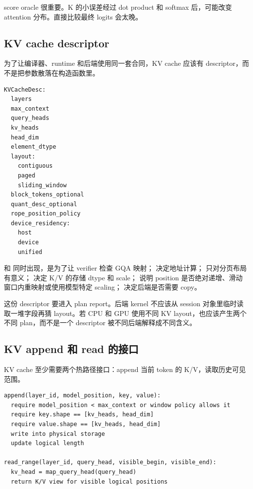 score oracle 很重要。K 的小误差经过 dot product 和 softmax 后，可能改变 attention 分布。直接比较最终 logits 会太晚。

\subsection{KV cache descriptor}

为了让编译器、runtime 和后端使用同一套合同，KV cache 应该有 descriptor，而不是把参数散落在构造函数里。

\begin{lstlisting}[numbers=none,caption={KVCacheDesc 字段}]
KVCacheDesc:
  layers
  max_context
  query_heads
  kv_heads
  head_dim
  element_dtype
  layout:
    contiguous
    paged
    sliding_window
  block_tokens_optional
  quant_desc_optional
  rope_position_policy
  device_residency:
    host
    device
    unified
\end{lstlisting}

 和  同时出现，是为了让 verifier 检查 GQA 映射； 决定地址计算； 只对分页布局有意义； 决定 K/V 的存储 dtype 和 scale； 说明 position 是否绝对递增、滑动窗口内重映射或使用模型特定 scaling； 决定后端是否需要 copy。

这份 descriptor 要进入 plan report。后端 kernel 不应该从 session 对象里临时读取一堆字段再猜 layout。若 CPU 和 GPU 使用不同 KV layout，也应该产生两个不同 plan，而不是一个 descriptor 被不同后端解释成不同含义。

\subsection{KV append 和 read 的接口}

KV cache 至少需要两个热路径接口：append 当前 token 的 K/V，读取历史可见范围。

\begin{lstlisting}[numbers=none,caption={KV append/read 合同}]
append(layer_id, model_position, key, value):
  require model_position < max_context or window policy allows it
  require key.shape == [kv_heads, head_dim]
  require value.shape == [kv_heads, head_dim]
  write into physical storage
  update logical length

read_range(layer_id, query_head, visible_begin, visible_end):
  kv_head = map_query_head(query_head)
  return K/V view for visible logical positions
\end{lstlisting}

